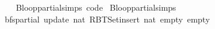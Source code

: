 \begin{isabellebody}
%
\isadelimproof
\ \ %
\endisadelimproof
%
\isatagproof
\isacommand{{\isachardot}{\kern0pt}{\isachardot}{\kern0pt}}\isamarkupfalse%
%
\endisatagproof
{\isafoldproof}%
%
\isadelimproof
\isanewline
%
\endisadelimproof
\isanewline
{}\isamarkupfalse%
\ B{\isachardot}{\kern0pt}loop{\isacharunderscore}{\kern0pt}partial{\isachardot}{\kern0pt}simps\ {\isacharbrackleft}{\kern0pt}code{\isacharbrackright}{\kern0pt}\isanewline
%
\isadeliminvisible
%
\endisadeliminvisible
%
\isataginvisible
{}\isamarkupfalse%
\ B{\isachardot}{\kern0pt}loop{\isacharunderscore}{\kern0pt}partial{\isachardot}{\kern0pt}simps\isanewline
{}\isamarkupfalse%
\ {\isachardoublequoteopen}bfs{\isacharunderscore}{\kern0pt}partial\ {\isacharparenleft}{\kern0pt}update\ {\isacharparenleft}{\kern0pt}{}{\isacharcolon}{\kern0pt}{\isacharcolon}{\kern0pt}nat{\isacharparenright}{\kern0pt}\ {\isacharparenleft}{\kern0pt}RBT{\isacharunderscore}{\kern0pt}Set{\isachardot}{\kern0pt}insert\ {\isacharparenleft}{\kern0pt}{}{\isacharcolon}{\kern0pt}{\isacharcolon}{\kern0pt}nat{\isacharparenright}{\kern0pt}\ empty{\isacharparenright}{\kern0pt}\ empty{\isacharparenright}{\kern0pt}\ {}{\isachardoublequoteclose}%
\endisataginvisible
{\isafoldinvisible}%
%
\isadeliminvisible
\isanewline
%
\endisadeliminvisible
%
\isadelimtheory
\isanewline
%
\endisadelimtheory
%
\isatagtheory
{}\isamarkupfalse%
%
\endisatagtheory
{\isafoldtheory}%
%
\isadelimtheory
%
\endisadelimtheory
%
\end{isabellebody}%
\endinput
